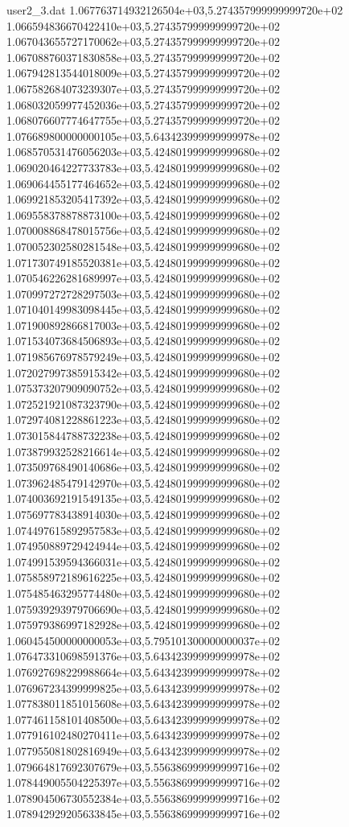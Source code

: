 \begin{filecontents}{user2_3.dat}
1.067763714932126504e+03,5.274357999999999720e+02
1.066594836670422410e+03,5.274357999999999720e+02
1.067043655727170062e+03,5.274357999999999720e+02
1.067088760371830858e+03,5.274357999999999720e+02
1.067942813544018009e+03,5.274357999999999720e+02
1.067582684073239307e+03,5.274357999999999720e+02
1.068032059977452036e+03,5.274357999999999720e+02
1.068076607774647755e+03,5.274357999999999720e+02
1.076689800000000105e+03,5.643423999999999978e+02
1.068570531476056203e+03,5.424801999999999680e+02
1.069020464227733783e+03,5.424801999999999680e+02
1.069064455177464652e+03,5.424801999999999680e+02
1.069921853205417392e+03,5.424801999999999680e+02
1.069558378878873100e+03,5.424801999999999680e+02
1.070008868478015756e+03,5.424801999999999680e+02
1.070052302580281548e+03,5.424801999999999680e+02
1.071730749185520381e+03,5.424801999999999680e+02
1.070546226281689997e+03,5.424801999999999680e+02
1.070997272728297503e+03,5.424801999999999680e+02
1.071040149983098445e+03,5.424801999999999680e+02
1.071900892866817003e+03,5.424801999999999680e+02
1.071534073684506893e+03,5.424801999999999680e+02
1.071985676978579249e+03,5.424801999999999680e+02
1.072027997385915342e+03,5.424801999999999680e+02
1.075373207909090752e+03,5.424801999999999680e+02
1.072521921087323790e+03,5.424801999999999680e+02
1.072974081228861223e+03,5.424801999999999680e+02
1.073015844788732238e+03,5.424801999999999680e+02
1.073879932528216614e+03,5.424801999999999680e+02
1.073509768490140686e+03,5.424801999999999680e+02
1.073962485479142970e+03,5.424801999999999680e+02
1.074003692191549135e+03,5.424801999999999680e+02
1.075697783438914030e+03,5.424801999999999680e+02
1.074497615892957583e+03,5.424801999999999680e+02
1.074950889729424944e+03,5.424801999999999680e+02
1.074991539594366031e+03,5.424801999999999680e+02
1.075858972189616225e+03,5.424801999999999680e+02
1.075485463295774480e+03,5.424801999999999680e+02
1.075939293979706690e+03,5.424801999999999680e+02
1.075979386997182928e+03,5.424801999999999680e+02
1.060454500000000053e+03,5.795101300000000037e+02
1.076473310698591376e+03,5.643423999999999978e+02
1.076927698229988664e+03,5.643423999999999978e+02
1.076967234399999825e+03,5.643423999999999978e+02
1.077838011851015608e+03,5.643423999999999978e+02
1.077461158101408500e+03,5.643423999999999978e+02
1.077916102480270411e+03,5.643423999999999978e+02
1.077955081802816949e+03,5.643423999999999978e+02
1.079664817692307679e+03,5.556386999999999716e+02
1.078449005504225397e+03,5.556386999999999716e+02
1.078904506730552384e+03,5.556386999999999716e+02
1.078942929205633845e+03,5.556386999999999716e+02

\end{filecontents}
